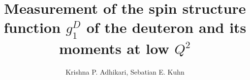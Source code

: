 \documentclass[12pt,epsfig]{report}
\begin{document}

\title{Measurement of the spin structure function $g^D_{1}$ of the deuteron and its moments at low $Q^2$}   
\author{Krishna P. Adhikari, Sebatian E. Kuhn}

\maketitle



\tableofcontents
\begin{comment} %
\listoffigures
\listoftables
\end{comment} %




%







\begin{comment} %







\end{comment} %



\begin{comment} %


\end{comment} %




\appendix
%
\end{document}
